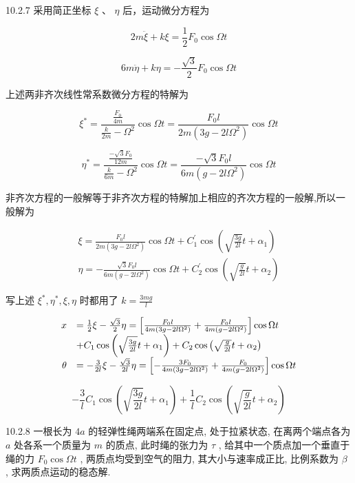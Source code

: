 \begin{problem}{10.2.7}
采用简正坐标 $\xi$ 、 $\eta$ 后，运动微分方程为

\[
2 m \ddot {\xi} + k \xi = \frac {1}{2} F _ {0} \cos \Omega t
\]

\[
6 m \ddot {\eta} + k \eta = - \frac {\sqrt {3}}{2} F _ {0} \cos \Omega t
\]

上述两非齐次线性常系数微分方程的特解为

\[
\xi^ {*} = \frac {\frac {F _ {0}}{4 m}}{\frac {k}{2 m} - \Omega^ {2}} \cos \Omega t = \frac {F _ {0} l}{2 m (3 g - 2 l \Omega^ {2})} \cos \Omega t
\]

\[
\eta^ {*} = \frac {\frac {- \sqrt {3} F _ {0}}{1 2 m}}{\frac {k}{6 m} - \Omega^ {2}} \cos \Omega t = \frac {- \sqrt {3} F _ {0} l}{6 m (g - 2 l \Omega^ {2})} \cos \Omega t
\]

非齐次方程的一般解等于非齐次方程的特解加上相应的齐次方程的一般解,所以一般解为

\[
\begin{array}{l} \xi = \frac {F _ {0} l}{2 m (3 g - 2 l \Omega^ {2})} \cos \Omega t + C _ {1} ^ {\prime} \cos \left(\sqrt {\frac {3 g}{2 l}} t + \alpha_ {1}\right) \\ \eta = - \frac {\sqrt {3} F _ {0} l}{6 m (g - 2 l \Omega^ {2})} \cos \Omega t + C _ {2} ^ {\prime} \cos \left(\sqrt {\frac {g}{2 l}} t + \alpha_ {2}\right) \end{array}
\]

写上述 $\xi^{*},\eta^{*},\xi ,\eta$ 时都用了 $k = \frac{3mg}{l}$ 

\[
\begin{array}{r l} x & = \frac {1}{2} \xi - \frac {\sqrt {3}}{2} \eta = \left[ \frac {F _ {0} l}{4 m (3 g - 2 l \Omega^ {2})} + \frac {F _ {0} l}{4 m (g - 2 l \Omega^ {2})} \right] \cos \Omega t \\ & + C _ {1} \cos \left(\sqrt {\frac {3 g}{2 l}} t + \alpha_ {1}\right) + C _ {2} \cos \left(\sqrt {\frac {g}{2 l}} t + \alpha_ {2}\right) \\ \theta & = - \frac {3}{2 l} \xi - \frac {\sqrt {3}}{2 l} \eta = \left[ - \frac {3 F _ {0}}{4 m (3 g - 2 l \Omega^ {2})} + \frac {F _ {0}}{4 m (g - 2 l \Omega^ {2})} \right] \cos \Omega t \end{array}
\]

\[
- \frac {3}{l} C _ {1} \cos \left(\sqrt {\frac {3 g}{2 l}} t + \alpha_ {1}\right) + \frac {1}{l} C _ {2} \cos \left(\sqrt {\frac {g}{2 l}} t + \alpha_ {2}\right)
\]
\begin{center}

\end{center}
\end{problem}
\clearpage


\begin{problem}{10.2.8}
一根长为 $4a$ 的轻弹性绳两端系在固定点, 处于拉紧状态, 在离两个端点各为 $a$ 处各系一个质量为 $m$ 的质点, 此时绳的张力为 $\tau$ , 给其中一个质点加一个垂直于绳的力 $F_{0} \cos \Omega t$ , 两质点均受到空气的阻力, 其大小与速率成正比, 比例系数为 $\beta$ , 求两质点运动的稳态解.
\end{problem}
\clearpage


